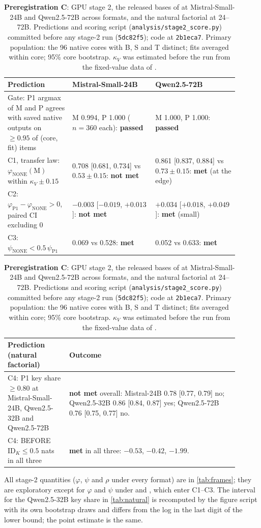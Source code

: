 \begin{table}[h]
\centering
\small
\caption{\textbf{Preregistration C}: GPU stage 2, the released bases of \citet{anonymous2026fitted} at Mistral-Small-24B and Qwen2.5-72B across formats, and the natural factorial at 24--72B. Predictions and scoring script (\texttt{analysis/stage2\_score.py}) committed before any stage-2 run (\texttt{5dc82f5}); code at \texttt{2b1eca7}. Primary population: the 96 native cores with B, S and T distinct; fits averaged within core; 95\% core bootstrap. $\kappa_V$ was estimated before the run from the fixed-value data of \citet{anonymous2026fitted}.}
\label{tab:prereg-c}
\begin{tabular}{p{0.24\linewidth}p{0.33\linewidth}p{0.33\linewidth}}
\toprule
Prediction & Mistral-Small-24B & Qwen2.5-72B \\
\midrule
Gate: P1 argmax of M and P agrees with saved native outputs on $\geq 0.95$ of (core, fit) items & M 0.994, P 1.000 ($n = 360$ each): \textbf{passed} & M 1.000, P 1.000: \textbf{passed} \\
C1, transfer law: $\varphi_{\text{NONE}}(\text{M})$ within $\kappa_V \pm 0.15$ & 0.708 [0.681, 0.734] vs $0.53 \pm 0.15$: \textbf{not met} & 0.861 [0.837, 0.884] vs $0.73 \pm 0.15$: \textbf{met} (at the edge) \\
C2: $\varphi_{\text{P1}} - \varphi_{\text{NONE}} > 0$, paired CI excluding 0 & $-0.003$ [$-0.019$, $+0.013$]: \textbf{not met} & $+0.034$ [$+0.018$, $+0.049$]: \textbf{met} (small) \\
C3: $\psi_{\text{NONE}} < 0.5\,\psi_{\text{P1}}$ & 0.069 vs 0.528: \textbf{met} & 0.052 vs 0.633: \textbf{met} \\
\bottomrule
\end{tabular}

\medskip
\begin{tabular}{p{0.24\linewidth}p{0.66\linewidth}}
\toprule
Prediction (natural factorial) & Outcome \\
\midrule
C4: P1 key share $\geq 0.80$ at Mistral-Small-24B, Qwen2.5-32B and Qwen2.5-72B & \textbf{not met} overall: Mistral-24B 0.78 [0.77, 0.79] no; Qwen2.5-32B 0.86 [0.84, 0.87] yes; Qwen2.5-72B 0.76 [0.75, 0.77] no. \\
C4: BEFORE $\mathrm{ID}_K \leq 0.5$ nats in all three & \textbf{met} in all three: $-0.53$, $-0.42$, $-1.99$. \\
\bottomrule
\end{tabular}
\end{table}

All stage-2 quantities ($\varphi$, $\psi$ and $\rho$ under every format) are in \cref{tab:frames}; they are exploratory except for $\varphi$ and $\psi$ under \fmtOpt{} and \fmtNone{}, which enter C1--C3. The interval for the Qwen2.5-32B key share in \cref{tab:natural} is recomputed by the figure script with its own bootstrap draws and differs from the log in the last digit of the lower bound; the point estimate is the same.

